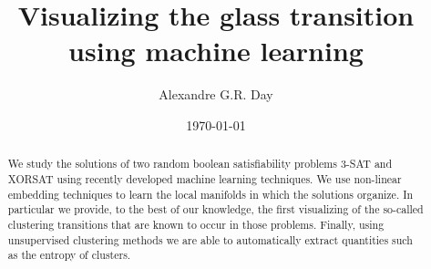\documentclass[showpacs,twocolumn,aps,floatfix,superscriptaddress,noshowpacs]{revtex4}
\begin{document}
	



\title{Visualizing the glass transition using machine learning}%

\author{Alexandre G.R. Day}

\begin{abstract}
We study the solutions of two random boolean satisfiability problems 3-SAT and XORSAT using recently developed machine learning techniques. We use non-linear embedding techniques to learn the local manifolds in which the solutions organize. In particular we provide, to the best of our knowledge, the first visualizing of the so-called clustering transitions that are known to occur in those problems. Finally, using unsupervised clustering methods we are able to automatically extract quantities such as the entropy of clusters.
\end{abstract} 

\date{\today}
\maketitle
\end{document}
